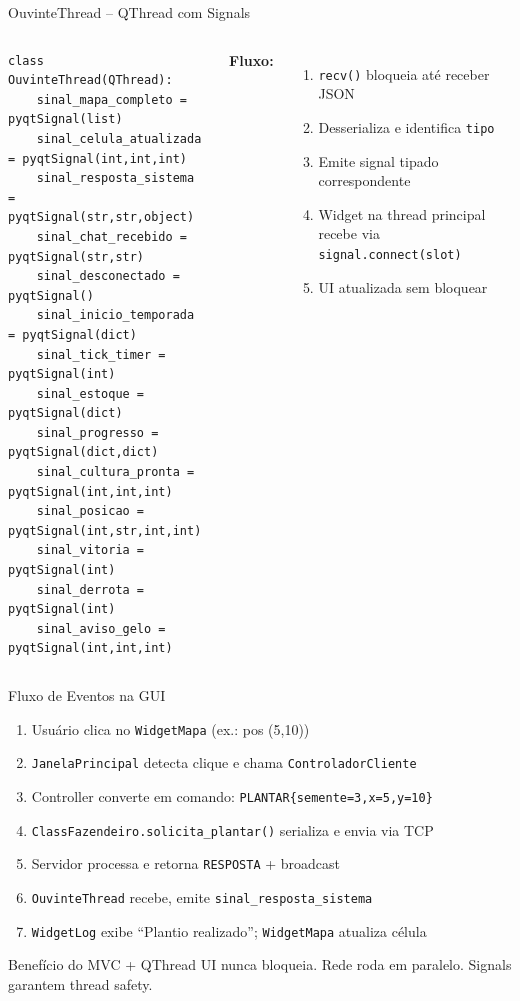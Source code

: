 \documentclass[aspectratio=169]{beamer}
\begin{document}
\begin{frame}[fragile, shrink=20]{OuvinteThread -- QThread com Signals}
  \begin{columns}
\begin{lstlisting}[style=pycode, basicstyle=\ttfamily\footnotesize]
class OuvinteThread(QThread):
    sinal_mapa_completo = pyqtSignal(list)
    sinal_celula_atualizada = pyqtSignal(int,int,int)
    sinal_resposta_sistema = pyqtSignal(str,str,object)
    sinal_chat_recebido = pyqtSignal(str,str)
    sinal_desconectado = pyqtSignal()
    sinal_inicio_temporada = pyqtSignal(dict)
    sinal_tick_timer = pyqtSignal(int)
    sinal_estoque = pyqtSignal(dict)
    sinal_progresso = pyqtSignal(dict,dict)
    sinal_cultura_pronta = pyqtSignal(int,int,int)
    sinal_posicao = pyqtSignal(int,str,int,int)
    sinal_vitoria = pyqtSignal(int)
    sinal_derrota = pyqtSignal(int)
    sinal_aviso_gelo = pyqtSignal(int,int,int)
\end{lstlisting}
    \textbf{Fluxo:}
    \begin{enumerate}
      \item \texttt{recv()} bloqueia at\'e receber JSON
      \item Desserializa e identifica \texttt{tipo}
      \item Emite signal tipado correspondente
      \item Widget na thread principal recebe via \texttt{signal.connect(slot)}
      \item UI atualizada sem bloquear
    \end{enumerate}
  \end{columns}
\end{frame}

\begin{frame}{Fluxo de Eventos na GUI}
  \begin{enumerate}
    \item Usu\'ario clica no \texttt{WidgetMapa} (ex.: pos (5,10))
    \item \texttt{JanelaPrincipal} detecta clique e chama \texttt{ControladorCliente}
    \item Controller converte em comando: \texttt{PLANTAR\{semente=3,x=5,y=10\}}
    \item \texttt{ClassFazendeiro.solicita\_plantar()} serializa e envia via TCP
    \item Servidor processa e retorna \texttt{RESPOSTA} + broadcast
    \item \texttt{OuvinteThread} recebe, emite \texttt{sinal\_resposta\_sistema}
    \item \texttt{WidgetLog} exibe ``Plantio realizado''; \texttt{WidgetMapa} atualiza c\'elula
  \end{enumerate}
  \vfill
  \begin{exampleblock}{Benef\'icio do MVC + QThread}
    UI nunca bloqueia. Rede roda em paralelo. Signals garantem thread safety.
  \end{exampleblock}
\end{frame}
\end{document}
